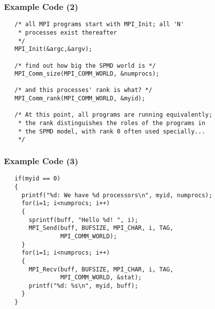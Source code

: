 \documentclass[aspectratio=43]{beamer}
\newenvironment{changemargin}[1]{%
  \begin{list}{}{%
    \setlength{\topsep}{0pt}%
    \setlength{\leftmargin}{#1}%
    \setlength{\rightmargin}{1em}
    \setlength{\listparindent}{\parindent}%
    \setlength{\itemindent}{\parindent}%
    \setlength{\parsep}{\parskip}%
  }%
  \item[]}{\end{list}}
\begin{document}
\begin{frame}[fragile]
  \frametitle{Example Code (2)}
  \begin{changemargin}{1cm}

  \begin{lstlisting}
   /* all MPI programs start with MPI_Init; all 'N'
    * processes exist thereafter
    */
   MPI_Init(&argc,&argv); 

   /* find out how big the SPMD world is */
   MPI_Comm_size(MPI_COMM_WORLD, &numprocs);

   /* and this processes' rank is what? */
   MPI_Comm_rank(MPI_COMM_WORLD, &myid);
 
   /* At this point, all programs are running equivalently;
    * the rank distinguishes the roles of the programs in
    * the SPMD model, with rank 0 often used specially...
    */
  \end{lstlisting}
  \end{changemargin}
\end{frame}

\begin{frame}[fragile]
  \frametitle{Example Code (3)}
  \begin{changemargin}{1cm}

  \begin{lstlisting}
   if(myid == 0)
   {
     printf("%d: We have %d processors\n", myid, numprocs);
     for(i=1; i<numprocs; i++)
     {
       sprintf(buff, "Hello %d! ", i);
       MPI_Send(buff, BUFSIZE, MPI_CHAR, i, TAG,
                MPI_COMM_WORLD);
     }
     for(i=1; i<numprocs; i++)
     {
       MPI_Recv(buff, BUFSIZE, MPI_CHAR, i, TAG,
                MPI_COMM_WORLD, &stat);
       printf("%d: %s\n", myid, buff);
     }
   }
  \end{lstlisting}
  \end{changemargin}
\end{frame}
\end{document}
